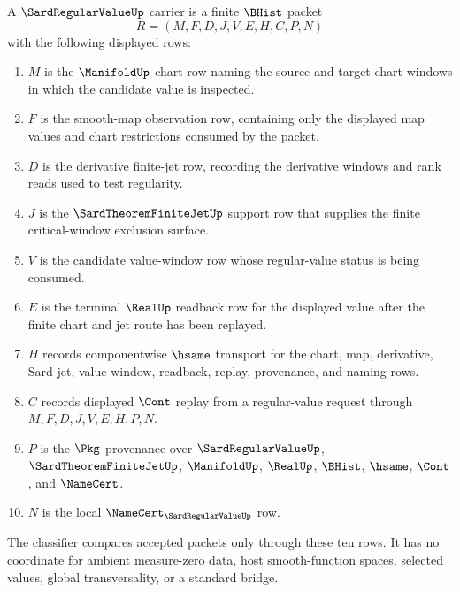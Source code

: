 \begin{definition}
\label{def:sard-regular-value-carrier}
A $\SardRegularValueUp$ carrier is a finite $\BHist$ packet
$$
R=(M,F,D,J,V,E,H,C,P,N)
$$
with the following displayed rows:
\begin{enumerate}
\item $M$ is the $\ManifoldUp$ chart row naming the source and target chart windows in which the candidate value is inspected.
\item $F$ is the smooth-map observation row, containing only the displayed map values and chart restrictions consumed by the packet.
\item $D$ is the derivative finite-jet row, recording the derivative windows and rank reads used to test regularity.
\item $J$ is the $\SardTheoremFiniteJetUp$ support row that supplies the finite critical-window exclusion surface.
\item $V$ is the candidate value-window row whose regular-value status is being consumed.
\item $E$ is the terminal $\RealUp$ readback row for the displayed value after the finite chart and jet route has been replayed.
\item $H$ records componentwise $\hsame$ transport for the chart, map, derivative, Sard-jet, value-window, readback, replay, provenance, and naming rows.
\item $C$ records displayed $\Cont$ replay from a regular-value request through $M,F,D,J,V,E,H,P,N$.
\item $P$ is the $\Pkg$ provenance over $\SardRegularValueUp$, $\SardTheoremFiniteJetUp$, $\ManifoldUp$, $\RealUp$, $\BHist$, $\hsame$, $\Cont$, and $\NameCert$.
\item $N$ is the local $\NameCert_{\SardRegularValueUp}$ row.
\end{enumerate}
The classifier compares accepted packets only through these ten rows. It has no coordinate for ambient measure-zero data, host smooth-function spaces, selected values, global transversality, or a standard bridge.
\end{definition}


